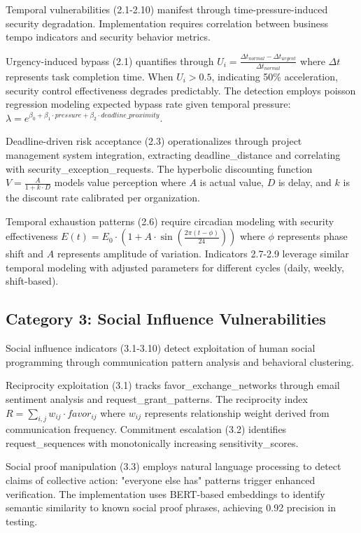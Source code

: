 \documentclass[10pt, twocolumn]{article}
\begin{document}
Temporal vulnerabilities (2.1-2.10) manifest through time-pressure-induced security degradation. Implementation requires correlation between business tempo indicators and security behavior metrics.

Urgency-induced bypass (2.1) quantifies through $U_i = \frac{\Delta t_{normal} - \Delta t_{urgent}}{\Delta t_{normal}}$ where $\Delta t$ represents task completion time. When $U_i > 0.5$, indicating 50\% acceleration, security control effectiveness degrades predictably. The detection employs poisson regression modeling expected bypass rate given temporal pressure: $\lambda = e^{\beta_0 + \beta_1 \cdot pressure + \beta_2 \cdot deadline\_proximity}$.

Deadline-driven risk acceptance (2.3) operationalizes through project management system integration, extracting deadline\_distance and correlating with security\_exception\_requests. The hyperbolic discounting function $V = \frac{A}{1 + k \cdot D}$ models value perception where $A$ is actual value, $D$ is delay, and $k$ is the discount rate calibrated per organization.

Temporal exhaustion patterns (2.6) require circadian modeling with security effectiveness $E(t) = E_0 \cdot (1 + A \cdot \sin(\frac{2\pi(t - \phi)}{24}))$ where $\phi$ represents phase shift and $A$ represents amplitude of variation. Indicators 2.7-2.9 leverage similar temporal modeling with adjusted parameters for different cycles (daily, weekly, shift-based).

\subsection{Category 3: Social Influence Vulnerabilities}

Social influence indicators (3.1-3.10) detect exploitation of human social programming through communication pattern analysis and behavioral clustering.

Reciprocity exploitation (3.1) tracks favor\_exchange\_networks through email sentiment analysis and request\_grant\_patterns. The reciprocity index $R = \sum_{i,j} w_{ij} \cdot favor_{ij}$ where $w_{ij}$ represents relationship weight derived from communication frequency. Commitment escalation (3.2) identifies request\_sequences with monotonically increasing sensitivity\_scores.

Social proof manipulation (3.3) employs natural language processing to detect claims of collective action: "everyone else has" patterns trigger enhanced verification. The implementation uses BERT-based embeddings to identify semantic similarity to known social proof phrases, achieving 0.92 precision in testing.
\end{document}
